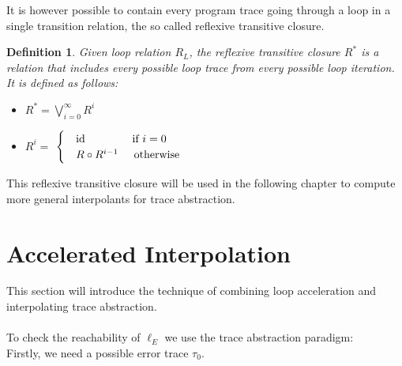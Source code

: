 \documentclass{article}
\newtheorem{mydef}{Definition}
\begin{document}
It is however possible to contain every program trace going through a loop in a single transition relation, the so called reflexive transitive closure.
\begin{mydef}
	Given loop relation $R_L$, the reflexive transitive closure $R^*$ is a relation that includes every possible loop trace from every possible loop iteration. It is defined as follows:
	\begin{itemize}
		\item $R^* = \bigvee_{i=0}^\infty R^i$
		\item $R^i = $
		$\begin{cases}
			& \text{id} \hspace{1.5cm} \text{if}\ i = 0 \\
			& R \circ R^{i - 1} \hspace{0.5cm}\text{otherwise}
		\end{cases}$
	\end{itemize}
\end{mydef}
This reflexive transitive closure will be used in the following chapter to compute more general interpolants for trace abstraction.

\section{Accelerated Interpolation}
This section will introduce the technique of combining loop acceleration and interpolating trace abstraction. \\\\

To check the reachability of $\ell_E$ we use the trace abstraction paradigm: \\
Firstly, we need a possible error trace $\tau_0$. \\ \\

\begin{figure}[H]
\end{figure}
\end{document}
